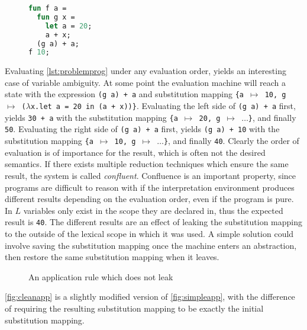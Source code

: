 \documentclass[11pt,oneside,a4paper]{report}
\begin{document}
\begin{figure}[ht]
\begin{lstlisting}[language=ML,caption={Problematic program},label={lst:problemprog},mathescape=true]
fun f a = 
  fun g x = 
    let a = 20;
    a + x;
  (g a) + a;
f 10;
\end{lstlisting}
\end{figure}
Evaluating \autoref{lst:problemprog} under any evaluation order, yields an interesting case of variable ambiguity.
At some point the evaluation machine will reach a state with the expression \texttt{(g a) + a} and substitution mapping \texttt{\{a $\mapsto$ 10, g $\mapsto$ ($\lambda$x.let a = 20 in (a + x))\}}.
Evaluating the left side of \texttt{(g a) + a} first, yields \texttt{30 + a} with the substitution mapping \texttt{\{a $\mapsto$ 20, g $\mapsto$ $\dots$\}}, and finally \texttt{50}.
Evaluating the right side of \texttt{(g a) + a} first, yields \texttt{(g a) + 10} with the substitution mapping \texttt{\{a $\mapsto$ 10, g $\mapsto$ $\dots$\}}, and finally \texttt{40}.
Clearly the order of evaluation is of importance for the result, which is often not the desired semantics.
If there exists multiple reduction techniques which ensure the same result, the system is called \textit{confluent}.
Confluence is an important property, since programs are difficult to reason with if the interpretation environment produces different results depending on the evaluation order, even if the program is pure.
In $L$ variables only exist in the scope they are declared in, thus the expected result is \texttt{40}.
The different results are an effect of leaking the substitution mapping to the outside of the lexical scope in which it was used.
A simple solution could involve saving the substitution mapping once the machine enters an abstraction, then restore the same substitution mapping when it leaves.
\begin{figure}[ht]
    \begin{mdframed}[style=style1]
        \vspace*{0.4cm}
          \begin{prooftree}
          \end{prooftree}   
    \end{mdframed}
    \caption{An application rule which does not leak}
    \label{fig:cleanapp}
\end{figure}
\noindent \autoref{fig:cleanapp} is a slightly modified version of \autoref{fig:simpleapp}, with the difference of requiring the resulting substitution mapping to be exactly the initial substitution mapping.
\end{document}
